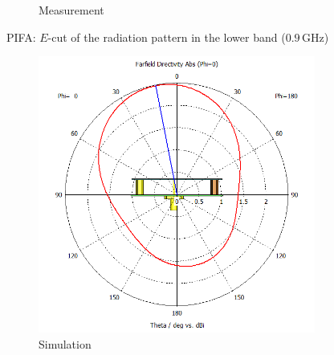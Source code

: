 \documentclass[11pt,a4paper]{article}
\begin{document}
\begin{figure}[!ht]
\begin{subfigure}{.4\textwidth}
                \caption{\label{fig:pifa-meas-radiation-e-0G9Hz}Measurement}
            \end{subfigure}
            \caption{\label{fig:pifa-radiation-e-0G9Hz}PIFA: $E$-cut of the radiation pattern in the lower band ($0.9\, \mathrm{GHz}$)}
        \end{figure}

\newpage
        \begin{figure}[!ht]
            \centering
            \begin{subfigure}{.4\textwidth}
                \centering
                \includegraphics[width=\textwidth]{src/pifa-sim-radiation-h-0G9Hz.png}
                \caption{\label{fig:pifa-sim-radiation-h-0G9Hz}Simulation}
            \end{subfigure}
            ~
            \begin{subfigure}{.4\textwidth}
                \centering

\end{subfigure}
\end{figure}
\end{document}

